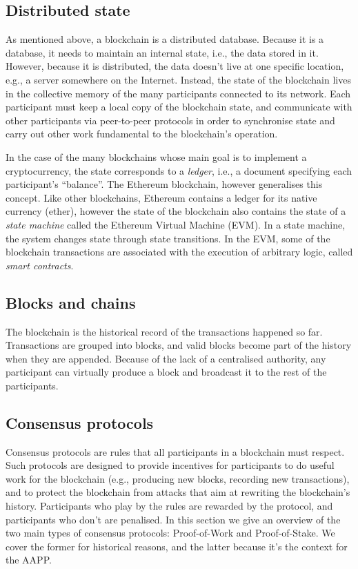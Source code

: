 \documentclass{article}
\begin{document}
\subsection{Distributed state}

As mentioned above, a blockchain is a distributed database. Because it is a
database, it needs to maintain an internal state, i.e., the data stored in it.
However, because it is distributed, the data doesn't live at one specific
location, e.g., a server somewhere on the Internet. Instead, the state of the
blockchain lives in the collective memory of the many participants connected to
its network. Each participant must keep a local copy of the blockchain state,
and communicate with other participants via peer-to-peer protocols in order to
synchronise state and carry out other work fundamental to the blockchain's
operation. 

In the case of the many blockchains whose main goal is to implement a
cryptocurrency, the state corresponds to a \emph{ledger}, i.e., a document
specifying each participant's ``balance''. The Ethereum blockchain, however
generalises this concept. Like other blockchains, Ethereum contains a ledger
for its native currency (ether), however the state of the blockchain also
contains the state of a \emph{state machine} called the Ethereum Virtual
Machine (EVM). In a state machine, the system changes state through state
transitions. In the EVM, some of the blockchain transactions are associated
with the execution of arbitrary logic, called \emph{smart contracts}.

\subsection{Blocks and chains}

The blockchain is the historical record of the transactions happened so far.
Transactions are grouped into blocks, and valid blocks become part of the
history when they are appended. Because of the lack of a centralised authority,
any participant can virtually produce a block and broadcast it to the rest of
the participants. 

\subsection{Consensus protocols}

Consensus protocols are rules that all participants in a blockchain must
respect. Such protocols are designed to provide incentives for participants to
do useful work for the blockchain (e.g., producing new blocks, recording new
transactions), and to protect the blockchain from attacks that aim at rewriting
the blockchain's history.  Participants who play by the rules are rewarded by
the protocol, and participants who don't are penalised. In this section we give
an overview of the two main types of consensus protocols: Proof-of-Work and
Proof-of-Stake.  We cover the former for historical reasons, and the latter
because it's the context for the AAPP.
\end{document}
